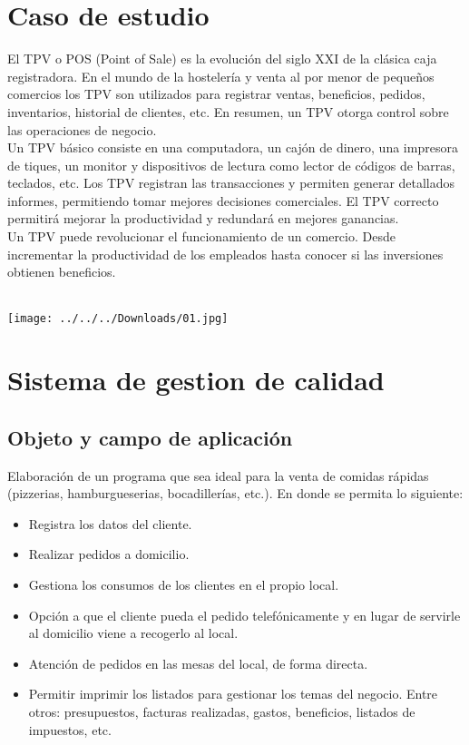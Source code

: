 \documentclass[12pt,a4paper]{article}
\begin{document}
\section{Caso de estudio}
El TPV o POS (Point of Sale) es la evolución del siglo XXI de la clásica caja registradora. En el mundo de la hostelería y venta al por menor de pequeños comercios los TPV son utilizados para registrar ventas, beneficios, pedidos, inventarios, historial de clientes, etc. En resumen, un TPV otorga control sobre las operaciones de negocio.\\
Un TPV básico consiste en una computadora, un cajón de dinero, una impresora de tiques, un monitor y dispositivos de lectura como lector de códigos de barras, teclados, etc. Los TPV registran las transacciones y permiten generar detallados informes, permitiendo tomar mejores decisiones comerciales. El TPV correcto permitirá mejorar la productividad y redundará en mejores ganancias.\\
Un TPV puede revolucionar el funcionamiento de un comercio. Desde incrementar la productividad de los empleados hasta conocer si las inversiones obtienen beneficios.\\\\
\begin{center}
\texttt{[image: ../../../Downloads/01.jpg]} 
\end{center}

\section{Sistema de gestion de calidad}
\subsection{Objeto y campo de aplicación}
Elaboración de un programa que sea ideal para la venta de comidas rápidas (pizzerias, hamburgueserias, bocadillerías, etc.). En donde se permita lo siguiente:
\begin{itemize}
\item Registra los datos del cliente.
\item Realizar pedidos a domicilio.
\item Gestiona los consumos de los clientes en el propio local.
\item Opción a que el cliente pueda el pedido telefónicamente y en lugar de servirle al domicilio viene a recogerlo al local.
\item Atención de pedidos en las mesas del local, de forma directa.
\item Permitir imprimir los listados para gestionar los temas del negocio. Entre otros: presupuestos, facturas realizadas, gastos, beneficios, listados de impuestos, etc.
\end{itemize}
\end{document}
